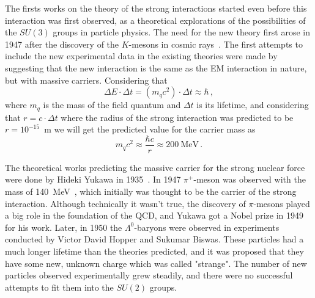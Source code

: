 The firsts works on the theory of the strong interactions started even before this interaction was first observed, as a theoretical explorations of the possibilities of the $SU(3)$ groups in particle physics. The need for the new theory first arose in 1947 after the discovery of the $K$-mesons in cosmic rays~\cite{lib:theory_kaon}. The first attempts to include the new experimental data in the existing theories were made by suggesting that the new interaction is the same as the EM interaction in nature, but with massive carriers. Considering that
\begin{equation}
\Delta E \cdot \Delta t = (m_{q}c^{2}) \cdot \Delta t \approx \hbar \,,
\end{equation}
where $m_{q}$ is the mass of the field quantum and $\Delta t$ is its lifetime, and considering that $r = c \cdot \Delta t$ where the radius of the strong interaction was predicted to be $r = 10^{-15}$~m we will get the predicted value for the carrier mass as
\begin{equation}
m_{q}c^{2} \approx \frac{\hbar c}{r} \approx 200 \: \mbox{MeV}\,.
\end{equation}

The theoretical works predicting the massive carrier for the strong nuclear force were done by Hideki Yukawa in 1935~\cite{lib:theory_mesons}. In 1947 $\pi^{+}$-meson was observed with the mass of 140~MeV~\cite{lib:theory_pion}, which initially was thought to be the carrier of the strong interaction. Although technically it wasn't true, the discovery of $\pi$-mesons played a big role in the foundation of the QCD, and Yukawa got a Nobel prize in 1949 for his work. Later, in 1950 the $\Lambda^{0}$-baryons were observed in experiments conducted by Victor David Hopper and Sukumar Biswas. These particles had a much longer lifetime than the theories predicted, and it was proposed that they have some new, unknown charge which was called "strange". The number of new particles observed experimentally grew steadily, and there were no successful attempts to fit them into the $SU(2)$ groups.

